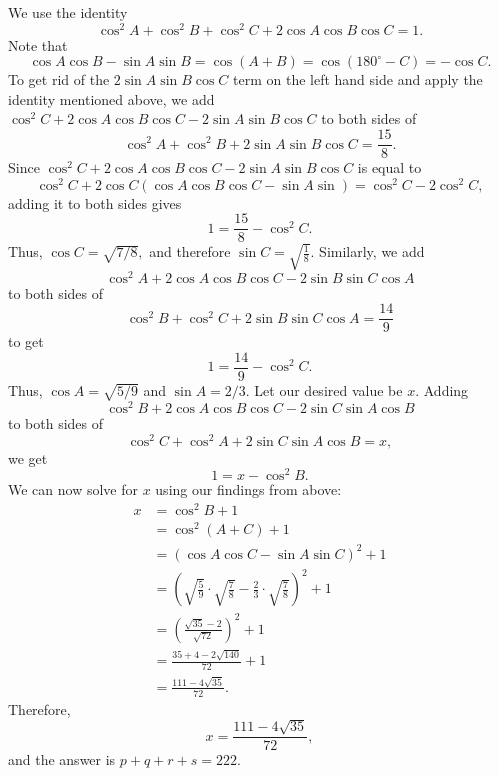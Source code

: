 \begin{solution}[name={Solution by peelybonehead}]
	We use the identity $$\cos^2 A + \cos^2 B + \cos^2 C + 2\cos A\cos B\cos C = 1.$$ Note that$$\cos A\cos B -\sin A\sin B = \cos(A+B) = \cos(180^\circ-C) = -\cos C.$$To get rid of the $2 \sin A \sin B \cos C$ term on the left hand side and apply the identity mentioned above, we add $\cos^2 C+2\cos A\cos B\cos C - 2\sin A \sin B \cos C$ to both sides of $$\cos^2 A + \cos^2 B + 2 \sin A \sin B \cos C = \frac{15}{8}.$$ Since $\cos^2 C+2\cos A\cos B\cos C - 2\sin A \sin B \cos C$ is equal to $$\cos^2 C+2\cos C(\cos A\cos B\cos C - \sin A \sin ) = \cos^2 C -2\cos^2 C,$$ adding it to both sides gives$$1 = \frac{15}{8} - \cos^2 C.$$Thus, $\cos C = \sqrt{{7}/{8}},$ and therefore $\sin C=\sqrt{\frac{1}{8}}$. Similarly, we add $$\cos^2 A+2\cos A\cos B\cos C - 2\sin B \sin C \cos A$$ to both sides of $$\cos^2 B + \cos^2 C + 2 \sin B \sin C \cos A = \frac{14}{9}$$ to get $$1 = \frac{14}{9} - \cos^2 C.$$ Thus, $\cos A=\sqrt{{5}/{9}}$ and $\sin A={2}/{3}.$ Let our desired value be $x.$ Adding $$\cos^2 B+2\cos A\cos B\cos C - 2\sin C \sin A \cos B$$ to both sides of $$\cos^2 C + \cos^2 A + 2 \sin C \sin A \cos B = x,$$ we get $$1 = x - \cos^2 B.$$ We can now solve for $x$ using our findings from above:
	\begin{align*}
		x &= \cos^2 B + 1 \\
		&= \cos^2  (A +  C) + 1 \\
		&= (\cos A \cos C - \sin  A \sin C)^2 + 1\\
		&= \left(\sqrt{\frac{5}{9}}\cdot \sqrt{\frac{7}{8}} - \frac{2}{3}\cdot \sqrt{\frac{7}{8}} \right )^2 + 1\\
		&= \left ( \frac{\sqrt{35} - 2}{\sqrt{72}} \right )^2 + 1 \\
		&= \frac{35+4-2\sqrt{140}}{72}+1 \\
		&= \frac{111-4\sqrt{35}}{72}.
	\end{align*}Therefore, $$x=\frac{111-4\sqrt{35}}{72},$$ and the answer is $p+q+r+s = \boxed{222}.$
\end{solution}











